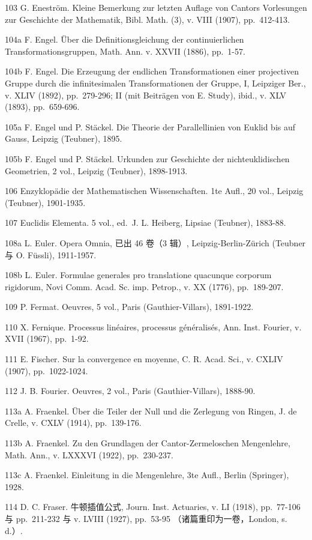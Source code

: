 103 G. Eneström. Kleine Bemerkung zur letzten Auflage von Cantors Vorlesungen zur Geschichte der Mathematik, Bibl. Math. (3), v. VIII (1907), pp.~412-413.

104a F. Engel. Über die Definitionsgleichung der continuierlichen Transformationsgruppen, Math. Ann. v. XXVII (1886), pp.~1-57.

104b F. Engel. Die Erzeugung der endlichen Transformationen einer projectiven Gruppe durch die infinitesimalen Transformationen der Gruppe, I, Leipziger Ber., v. XLIV (1892), pp.~279-296; II (mit Beiträgen von E. Study), ibid., v. XLV (1893), pp.~659-696.

105a F. Engel und P. Stäckel. Die Theorie der Parallellinien von Euklid bis auf Gauss, Leipzig (Teubner), 1895.

105b F. Engel und P. Stäckel. Urkunden zur Geschichte der nichteuklidischen Geometrien, 2 vol., Leipzig (Teubner), 1898-1913.

106 Enzyklopädie der Mathematischen Wissenschaften. 1te Aufl., 20 vol., Leipzig (Teubner), 1901-1935.

107 Euclidis Elementa. 5 vol., ed.~J. L. Heiberg, Lipsiae (Teubner), 1883-88.

108a L. Euler. Opera Omnia, 已出 46 卷（3 辑）, Leipzig-Berlin-Zürich (Teubner 与 O. Füssli), 1911-1957.

108b L. Euler. Formulae generales pro translatione quacunque corporum rigidorum, Novi Comm. Acad. Sc. imp. Petrop., v. XX (1776), pp.~189-207.

109 P. Fermat. Oeuvres, 5 vol., Paris (Gauthier-Villars), 1891-1922.

110 X. Fernique. Processus linéaires, processus généralisés, Ann. Inst. Fourier, v. XVII (1967), pp.~1-92.

111 E. Fischer. Sur la convergence en moyenne, C. R. Acad. Sci., v. CXLIV (1907), pp.~1022-1024.

112 J. B. Fourier. Oeuvres, 2 vol., Paris (Gauthier-Villars), 1888-90.

113a A. Fraenkel. Über die Teiler der Null und die Zerlegung von Ringen, J. de Crelle, v. CXLV (1914), pp.~139-176.

113b A. Fraenkel. Zu den Grundlagen der Cantor-Zermeloschen Mengenlehre, Math. Ann., v. LXXXVI (1922), pp.~230-237.

113c A. Fraenkel. Einleitung in die Mengenlehre, 3te Aufl., Berlin (Springer), 1928.

114 D. C. Fraser. 牛顿插值公式, Journ. Inst. Actuaries, v. LI (1918), pp.~77-106 与 pp.~211-232 与 v. LVIII (1927), pp.~53-95 （诸篇重印为一卷，London, s. d.）.

